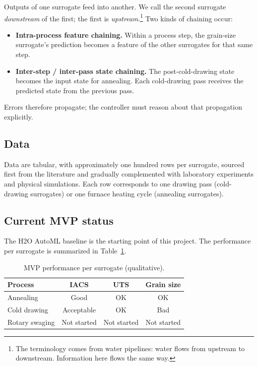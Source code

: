 \documentclass[11pt,a4paper]{article}
\begin{document}
Outputs of one surrogate feed into another. We call the second surrogate \emph{downstream} of the first; the first is \emph{upstream}.\footnote{The terminology comes from water pipelines: water flows from upstream to downstream. Information here flows the same way.} Two kinds of chaining occur:
\begin{itemize}
    \item \textbf{Intra-process feature chaining.} Within a process step, the grain-size surrogate's prediction becomes a feature of the other surrogates for that same step.
    \item \textbf{Inter-step / inter-pass state chaining.} The post-cold-drawing state becomes the input state for annealing. Each cold-drawing pass receives the predicted state from the previous pass.
\end{itemize}
Errors therefore propagate; the controller must reason about that propagation explicitly.

\subsection{Data}

Data are tabular, with approximately one hundred rows per surrogate, sourced first from the literature and gradually complemented with laboratory experiments and physical simulations. Each row corresponds to one drawing pass (cold-drawing surrogates) or one furnace heating cycle (annealing surrogates).

\subsection{Current MVP status}

The H2O AutoML baseline is the starting point of this project. The performance per surrogate is summarized in Table~\ref{tab:status}.

\begin{table}[h]
\centering
\begin{tabular}{lccc}
\toprule
\textbf{Process} & \textbf{IACS} & \textbf{UTS} & \textbf{Grain size} \\
\midrule
Annealing       & Good        & OK   & OK \\
Cold drawing    & Acceptable  & OK   & Bad \\
Rotary swaging  & Not started & Not started & Not started \\
\bottomrule
\end{tabular}
\caption{MVP performance per surrogate (qualitative).}
\label{tab:status}
\end{table}
\end{document}
